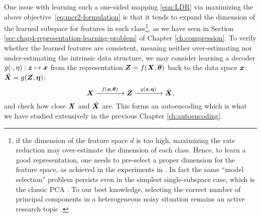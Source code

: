 \documentclass[../../book-main.tex]{subfiles}
\begin{document}
{One issue with learning such a one-sided mapping \eqref{eqn:LDR} via  maximizing the above \mbox{objective \eqref{eq:mcr2-formulation}} is that it tends to expand the dimension of the learned subspace for features in each class\footnote{if the dimension of the feature space $d$ is too high, maximizing the rate reduction may over-estimate the dimension of each class. Hence, to learn a good representation, one needs to pre-select a proper dimension for the feature space, as achieved in the experiments in \cite{yu2020learning}. In fact the same ``model selection'' problem persists even in the simplest single-subspace case, which is the classic PCA \cite{Jolliffe1986}. To our best knowledge, selecting the correct number of principal components in a heterogeneous noisy situation remains an active research topic \cite{hong2020selecting}.}, as we have seen in Section \ref{sec:chap4-representation-learning-problem} of Chapter \ref{ch:compression}. To verify whether the learned features are consistent, meaning neither over-estimating nor under-estimating the intrinsic data structure, we may consider learning a decoder $g(\cdot,\eta): \bm{z} \mapsto  \bm{x}$ from the representation $\bm{Z} = f(\bm{X},\bm\theta)$ back to the data space $\bm{x}$: $\hat {\bm{X}} = g(\bm{Z}, \bm\eta)$:
\begin{equation}
    \bm{X} \xrightarrow{\hspace{2mm} f(\bm{x}, \bm\theta)\hspace{2mm}} \bm{Z} \xrightarrow{\hspace{2mm} g(\bm{z}, \bm \eta) \hspace{2mm}} \hat {\bm{X}}, 
    \label{eqn:autoencoding-ch6}
\end{equation}
and check how close $\bm{X}$ and $\hat {\bm{X}}$ are. This forms an autoencoding which is  what we have studied extensively in the previous Chapter \ref{ch:autoencoding}.

}
\end{document}
